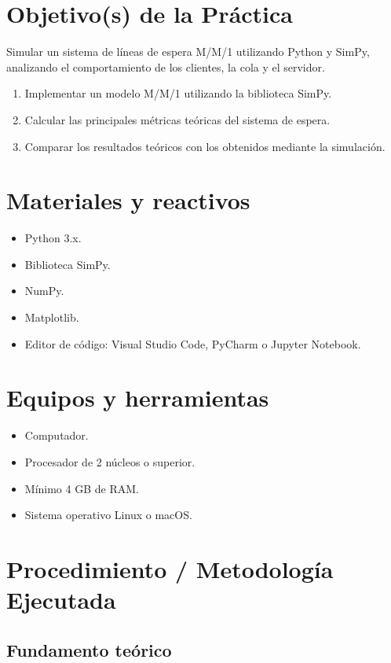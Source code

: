 \documentclass[11pt,a4paper]{article}
\begin{document}
\section{Objetivo(s) de la Práctica}
Simular un sistema de líneas de espera M/M/1 utilizando Python y SimPy, analizando
el comportamiento de los clientes, la cola y el servidor.
\begin{enumerate}
    \item Implementar un modelo M/M/1 utilizando la biblioteca SimPy.
    \item Calcular las principales métricas teóricas del sistema de espera.
    \item Comparar los resultados teóricos con los obtenidos mediante la simulación.
\end{enumerate}

\section{Materiales y reactivos}
\begin{itemize}
    \item Python 3.x.
    \item Biblioteca SimPy.
    \item NumPy.
    \item Matplotlib.
    \item Editor de código: Visual Studio Code, PyCharm o Jupyter Notebook.
\end{itemize}

\section{Equipos y herramientas}
\begin{itemize}
    \item Computador.
    \item Procesador de 2 núcleos o superior.
    \item Mínimo 4 GB de RAM.
    \item Sistema operativo Linux o macOS.
\end{itemize}

\section{Procedimiento / Metodología Ejecutada}

\subsection{Fundamento teórico}
\end{document}
